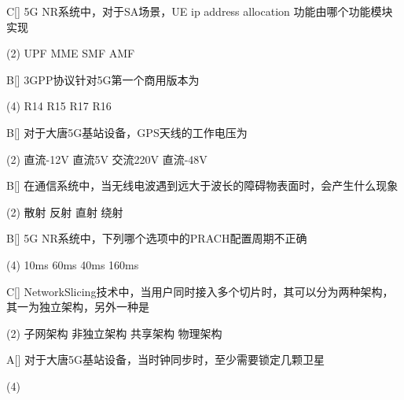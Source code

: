 \begin{choice}{C}[]
    5G NR系统中，对于SA场景，UE ip address allocation 功能由哪个功能模块实现
    \begin{tasks}(2)
        \task UPF
        \task MME
        \task SMF
        \task AMF
    \end{tasks}
\end{choice}


\begin{choice}{B}[]
    3GPP协议针对5G第一个商用版本为
    \begin{tasks}(4)
        \task R14
        \task R15
        \task R17
        \task R16
    \end{tasks}
\end{choice}

\begin{choice}{B}[]
    对于大唐5G基站设备，GPS天线的工作电压为
    \begin{tasks}(2)
        \task 直流-12V
        \task 直流5V
        \task 交流220V
        \task 直流-48V
    \end{tasks}
\end{choice}


\begin{choice}{B}[]
    在通信系统中，当无线电波遇到远大于波长的障碍物表面时，会产生什么现象
    \begin{tasks}(2)
        \task 散射
        \task 反射
        \task 直射
        \task 绕射
    \end{tasks}
\end{choice}


\begin{choice}{B}[]
    5G NR系统中，下列哪个选项中的PRACH配置周期不正确
    \begin{tasks}(4)
        \task 10ms
        \task 60ms
        \task 40ms
        \task 160ms
    \end{tasks}
\end{choice}


\begin{choice}{C}[]
    NetworkSlicing技术中，当用户同时接入多个切片时，其可以分为两种架构，其一为独立架构，另外一种是
    \begin{tasks}(2)
        \task 子网架构
        \task 非独立架构
        \task 共享架构
        \task 物理架构
    \end{tasks}
\end{choice}


\begin{choice}{A}[]
    对于大唐5G基站设备，当时钟同步时，至少需要锁定几颗卫星
    \begin{tasks}(4)
    \end{tasks}
\end{choice}




